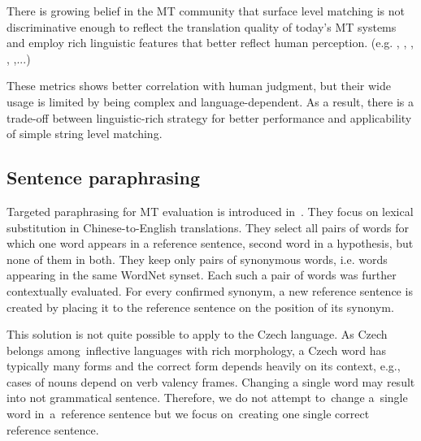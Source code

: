 \documentclass[11pt]{article}
\begin{document}
There is growing belief in the MT community that surface level matching is not
discriminative enough to reflect the translation quality of today’s MT systems %
and employ rich linguistic features that better reflect human perception. (e.g.
 , , , 
 , \cite{Pado09},...) 
 
 
These metrics shows better correlation with human judgment, but their wide 
usage is limited by being complex and language-dependent. As a result, there is
a trade-off between linguistic-rich strategy for better performance and 
applicability of simple string level matching.


\subsection{Sentence paraphrasing}
Targeted paraphrasing for MT evaluation is introduced in~. 
They focus on lexical substitution in Chinese-to-English translations. They 
select all pairs of words for which one word appears in a reference sentence, 
second word in a hypothesis, but none of them in both. They keep only 
pairs of synonymous words, i.e. words appearing in the same WordNet 
\cite{wordnet} synset. Each such a pair of words was further contextually 
evaluated. For every confirmed synonym, a new reference sentence is created by 
placing it to the reference sentence on the position of its synonym.

This solution is not quite possible to apply to the Czech language. As Czech 
belongs among~inflective languages with rich morphology, a Czech word has 
typically many forms and the correct form depends heavily on its context, 
e.g., cases of nouns depend on verb valency frames. Changing a single word may 
result into not grammatical sentence. Therefore, we do not attempt to~change 
a~single word in~a~reference sentence but we focus on~creating one single 
correct reference sentence.
\end{document}
